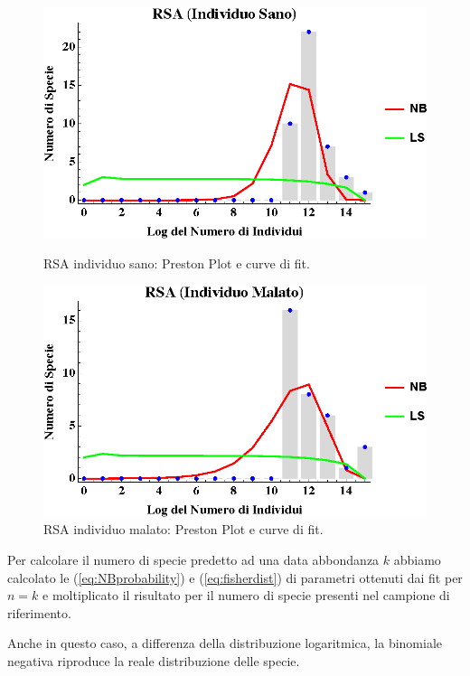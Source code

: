 \begin{figure}[H]
  \centering
  \begin{minipage}[b]{0.45\textwidth}
    \includegraphics[width=\textwidth]{Figure/rsaplotH.eps}
    \caption{RSA individuo sano: Preston Plot e curve di fit.}
    \label{fig:plotRSAH}
  \end{minipage}
  \hfill
  \begin{minipage}[b]{0.45\textwidth}
    \includegraphics[width=\textwidth]{Figure/rsaplotC.eps}
    \caption{RSA individuo malato: Preston Plot e curve di fit.}
    \label{fig:plotRSAC}
  \end{minipage}
\end{figure}

Per calcolare il numero di specie predetto ad una data abbondanza $k$ abbiamo calcolato le (\ref{eq:NBprobability}) e (\ref{eq:fisherdist}) di parametri ottenuti dai fit per $n=k$ e moltiplicato il risultato per il numero di specie presenti nel campione di riferimento.


Anche in questo caso, a differenza della distribuzione logaritmica, la binomiale negativa riproduce la reale distribuzione delle specie.


